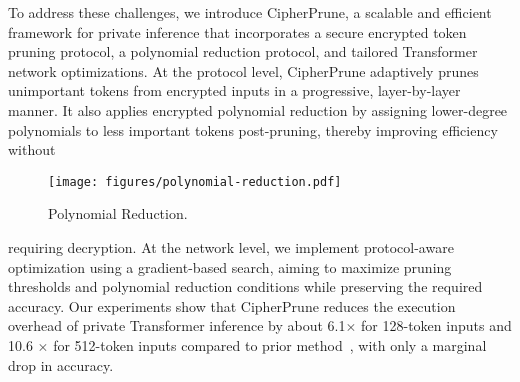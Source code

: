





To address these challenges, we introduce CipherPrune, a scalable and efficient framework for private inference that incorporates a secure encrypted token pruning protocol, a polynomial reduction protocol, and tailored Transformer network optimizations. At the protocol level, CipherPrune adaptively prunes unimportant tokens from encrypted inputs in a progressive, layer-by-layer manner. It also applies encrypted polynomial reduction by assigning lower-degree polynomials to less important tokens post-pruning, thereby improving efficiency without
\begin{wrapfigure}{r}{0.4\textwidth}  %
  \centering
    \texttt{[image: figures/polynomial-reduction.pdf]}
  \caption{Polynomial Reduction.}
  \vspace{-0.1in}
  \label{f:polynomial-reduction}
\end{wrapfigure}
requiring decryption. At the network level, we implement protocol-aware optimization using a gradient-based search, aiming to maximize pruning thresholds and polynomial reduction conditions while preserving the required accuracy. Our experiments show that CipherPrune reduces the execution overhead of private Transformer inference by about 6.1$\times$ for 128-token inputs and 10.6 $\times$ for 512-token inputs compared to prior method~\citep{pang2023bolt}, {with only a marginal drop in accuracy}.


